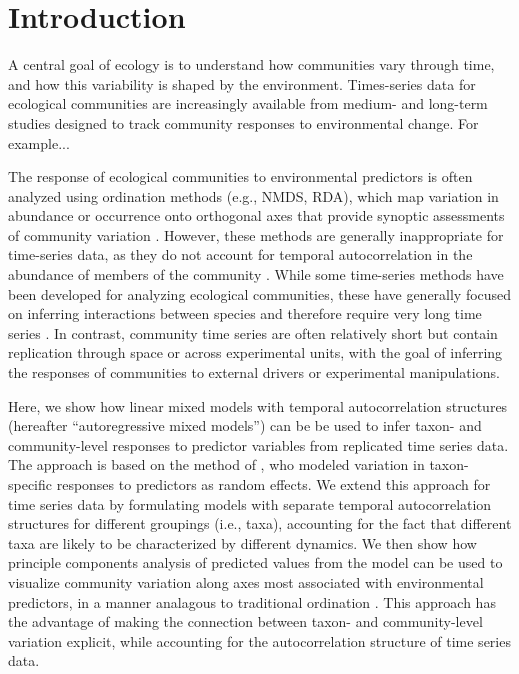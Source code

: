 \section*{Introduction}

A central goal of ecology is to understand how communities vary through time, and
how this variability is shaped by the environment.
Times-series data for ecological communities are increasingly available
from medium- and long-term studies designed to track community responses
to environmental change. For example...

The response of ecological communities to environmental predictors is often analyzed using
ordination methods (e.g., NMDS, RDA),
which map variation in abundance or occurrence onto orthogonal
axes that provide synoptic assessments of community variation \citep{Mcgarigal2013}.
However, these methods are generally inappropriate for time-series data,
as they do not account
for temporal autocorrelation in the abundance of members of the community \citep{Ives2006}.
While some time-series methods have been developed for analyzing ecological communities,
these have generally focused on inferring interactions between species and therefore
require very long time series \citep{Ives1999, Hampton2013}.
In contrast, community time series are often relatively short but
contain replication through space or across experimental units, with the goal of inferring
the responses of communities to external drivers or experimental manipulations.

Here, we show how linear mixed models with temporal autocorrelation structures
(hereafter ``autoregressive mixed models'') can be be used to infer taxon- and
community-level responses to predictor variables from replicated time series data. The
approach is based on the method of \cite{Jackson2012},
who modeled variation in taxon-specific responses to predictors as
random effects.
We extend this approach for time series data by formulating models with separate
temporal autocorrelation structures for different groupings (i.e., taxa),
accounting for the fact that different taxa are likely to be characterized by
different dynamics. We then show how principle components analysis of predicted values
from the model can be used to visualize
community variation along axes most associated with environmental predictors,
in a manner analagous to traditional ordination \citep{Jackson2012}.
This approach has the advantage of making the connection between
taxon- and community-level variation explicit, while accounting for the autocorrelation
structure of time series data.

